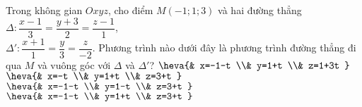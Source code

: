 \begin{ex}%
Trong không gian $Oxyz$, cho điểm $M(-1;1;3)$ và hai đường thẳng $\Delta \colon \dfrac{x-1}{3}=\dfrac{y+3}{2}=\dfrac{z-1}{1}$, \\
$\Delta' \colon \dfrac{x+1}{1}=\dfrac{y}{3}=\dfrac{z}{-2}$. Phương trình nào dưới đây là phương trình đường thẳng đi qua $M$ và vuông góc với $\Delta$ và $\Delta'$?
\choice
{$\heva{& x=-1-t \\& y=1+t \\& z=1+3t }$}
{$\heva{& x=-t \\& y=1+t \\& z=3+t }$}
{$\heva{& x=-1-t \\& y=1-t \\& z=3+t }$}
{\True $\heva{& x=-1-t \\& y=1+t \\& z=3+t }$}
\end{ex}



